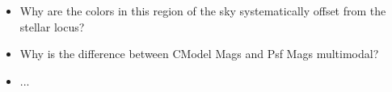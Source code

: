 \documentclass[DM,authoryear,toc,lsstdraft]{lsstdoc}
\begin{document}
\begin{itemize}

\item{Why are the colors in this region of the sky systematically offset from
the stellar locus?}

\item{Why is the difference between CModel Mags and Psf Mags multimodal?}

\item{...}

\end{itemize}

%
\printglossary[style=index]


\end{document}
